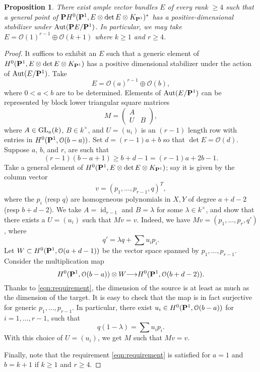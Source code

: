 \documentclass[11pt,reqno]{amsart}
\theoremstyle{plain}
\newtheorem{proposition}[theorem]{Proposition}
\theoremstyle{definition}
\theoremstyle{remark}
\numberwithin{equation}{section}
\renewcommand{\k}{k}
\DeclareMathOperator{\id}{id}
\renewcommand{\to}{{\longrightarrow}}
\numberwithin{equation}{section}
\renewcommand{\O}{\mathcal O}
\begin{document}
\begin{proposition}\label{prop:existgenstab}
  There exist ample vector bundles $E$ of every rank $\geq 4$ such that a general point of $\P H^0(\P^1, E \otimes \det E \otimes K_{\P^1})^*$ has a positive-dimensional stabilizer under $\Aut(\P E/\P^1)$.
  In particular, we may take $E = \O(1)^{r-1} \oplus \O(k+1)$ where $k \geq 1$ and $r \geq 4$.
\end{proposition}
\begin{proof}
  It suffices to exhibit an $E$ such that a generic element of $H^0(\P^1, E \otimes \det E \otimes K_{\P^1})$ has a positive dimensional stabilizer under the action of $\Aut(E/\P^1)$.
  Take
  \[ E = \O(a)^{r-1} \oplus \O(b),\]
  where $0 < a < b$ are to be determined.
  Elements of $\Aut (E/\P^1)$ can be represented by block lower triangular square matrices
  \[M = 
    \begin{pmatrix}
      A &  \\
      U & B
    \end{pmatrix},
  \]
  where $A \in \GL_a(\k)$, $B \in \k^\times$, and $U = (u_i)$ is an $(r-1)$ length row with entries in $H^0(\P^1, \O(b-a))$.
  Set $d = (r-1)a + b$ so that $\det E = \O(d)$.
  Suppose $a$, $b$, and $r$, are such that
  \begin{equation}\label{eqn:requirement}
    (r-1) (b-a+1) \geq b+d-1 = (r-1)a+2b-1.
  \end{equation}
  Take a general element of $H^0(\P^1, E \otimes \det E \otimes K_{\P^1})$; say it is given by the column vector
  \[ v = (p_1, \dots, p_{r-1}, q)^T,\]
  where the $p_i$ (resp $q$) are homogeneous polynomials in $X, Y$ of degree $a+d-2$ (resp $b+d-2$).
  We take $A = \id_{r-1}$ and $B = \lambda$ for some $\lambda \in \k^\times$, and show that there exists a $U = (u_{i})$ such that $Mv = v$.
  Indeed, we have $Mv = (p_1, \dots, p_r, q')$, where
  \[ q' = \lambda q + \sum u_{i}p_i. \]
  Let $W \subset H^0(\P^1, \O(a+d-1))$ be the vector space spanned by $p_1, \dots, p_{r-1}$.
  Consider the multiplication map
  \[ H^0(\P^1, \O(b-a)) \otimes W \to H^0(\P^1, \O(b+d-2)).\]
  Thanks to \eqref{eqn:requirement}, the dimension of the source is at least as much as the dimension of the target.
  It is easy to check that the map is in fact surjective for generic $p_1, \dots, p_{r-1}$.
  In particular, there exist $u_i \in H^0(\P^1, \O(b-a))$ for $i = 1, \dots, r-1$, such that
  \[ q(1-\lambda) = \sum u_i p_i.\]
  With this choice of $U = (u_i)$, we get $M$ such that $Mv = v$.

  Finally, note that the requirement \eqref{eqn:requirement} is satisfied for $a = 1$ and $b = k+1$ if $k \geq 1$ and $r \geq 4$.
\end{proof}
\end{document}
